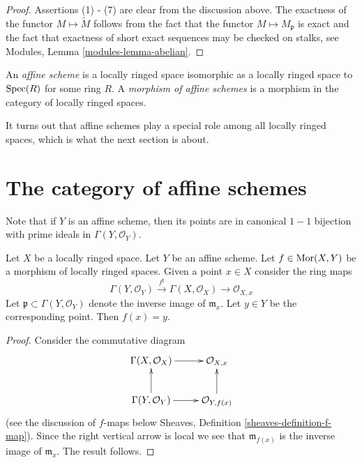 \begin{proof}
Assertions (1) - (7) are clear from the discussion above.
The exactness of the functor $M \mapsto \widetilde M$
follows from the fact that the functor $M \mapsto M_{\mathfrak p}$
is exact and the fact that exactness of short exact sequences
may be checked on stalks, see
Modules, Lemma \ref{modules-lemma-abelian}.
\end{proof}

\begin{definition}
\label{definition-affine-scheme}
An {\it affine scheme} is a locally ringed space isomorphic
as a locally ringed space to $\mathop{\rm Spec}(R)$ for some ring $R$.
A {\it morphism of affine schemes} is a morphism in the category
of locally ringed spaces.
\end{definition}

\noindent
It turns out that affine schemes play a special role
among all locally ringed spaces, which is what the next
section is about.


















\section{The category of affine schemes}
\label{section-category-affine-schemes}

\noindent
Note that if $Y$ is an affine scheme, then its
points are in canonical $1-1$ bijection with
prime ideals in $\Gamma(Y, \mathcal{O}_Y)$.

\begin{lemma}
\label{lemma-morphism-into-affine-where-point-goes}
Let $X$ be a locally ringed space.
Let $Y$ be an affine scheme.
Let $f \in \mathop{\rm Mor}\nolimits(X, Y)$ be a morphism
of locally ringed spaces. Given a point $x \in X$
consider the ring maps
$$
\Gamma(Y, \mathcal{O}_Y) \xrightarrow{f^\sharp}
\Gamma(X, \mathcal{O}_X) \to \mathcal{O}_{X, x}
$$
Let $\mathfrak p \subset \Gamma(Y, \mathcal{O}_Y)$ denote
the inverse image of $\mathfrak m_x$. Let $y \in Y$ be the
corresponding point. Then $f(x) = y$.
\end{lemma}

\begin{proof}
Consider the commutative diagram
$$
\xymatrix{
\Gamma(X, \mathcal{O}_X) \ar[r] &
\mathcal{O}_{X, x} \\
\Gamma(Y, \mathcal{O}_Y) \ar[r] \ar[u] &
\mathcal{O}_{Y, f(x)} \ar[u]
}
$$
(see the discussion of $f$-maps below
Sheaves, Definition \ref{sheaves-definition-f-map}).
Since the right vertical arrow is local
we see that $\mathfrak m_{f(x)}$ is the
inverse image of $\mathfrak m_x$. The result
follows.
\end{proof}

